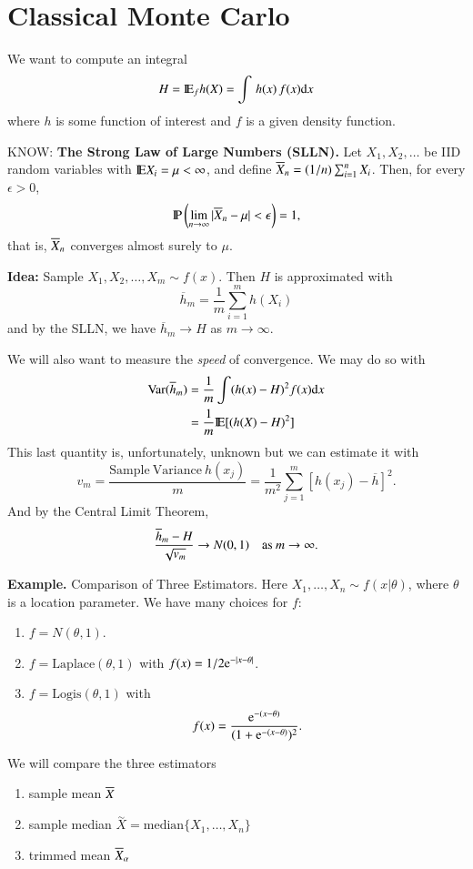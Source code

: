 \documentclass[11pt,english]{scrbook}
\begin{document}
\section{Classical Monte Carlo}
\label{sec:orge146c20}

We want to compute an integral 
\[
H=\mathrm{I\hspace{-1.5pt}E}_{f}h(X)=\int\, h(x)\, f(x)\mathrm{d} x
\]
where \(h\) is some function of interest and \(f\) is a given density function.

KNOW: \textbf{The Strong Law of Large Numbers (SLLN).} Let \(X_{1},X_{2},\ldots\) be IID random variables with \(\mathrm{I\hspace{-1.5pt}E} X_{i} = \mu < \infty\), and define \(\overline{X}_{n}=(1/n)\sum_{i=1}^{n}X_{i}\). Then, for every \(\epsilon>0\), 
\[
\mathrm{I\hspace{-1.5pt}P} \left(\lim_{n\to\infty} |\overline{X}_{n}-\mu| < \epsilon \right)=1,
\]
that is, \(\overline{X}_{n}\) converges almost surely to \(\mu\).

\textbf{Idea:} Sample \(X_{1},X_{2},\ldots,X_{m}\sim f(x)\). Then \(H\) is approximated with 
\[
\overline{h}_{m}=\frac{1}{m}\sum_{i=1}^{m}h(X_{i})
\]
and by the SLLN, we have \(\overline{h}_{m}\to H\) as \(m\to\infty\).

We will also want to measure the \emph{speed} of convergence. We may do so with 
\begin{align*}
\mathrm{Var}(\overline{h}_{m}) & =\frac{1}{m}\int(h(x)-H)^{2}f(x)\mathrm{d} x\\
 & =\frac{1}{m}\mathrm{I\hspace{-1.5pt}E}[(h(X)-H)^{2}]
\end{align*}
This last quantity is, unfortunately, unknown but we can estimate it with 
\[
v_{m}=\frac{\mathrm{Sample\ Variance}\ h(x_{j})}{m}=\frac{1}{m^{2}}\sum_{j=1}^{m}[h(x_{j})-\overline{h}]^{2}.
\]
And by the Central Limit Theorem, 
\[
\frac{\overline{h}_{m}-H}{\sqrt{v_{m}}}\to N(0,1)\quad\mbox{as \ensuremath{m\to\infty}}.
\]


\textbf{Example.} Comparison of Three Estimators. Here \(X_{1},\ldots,X_{n}\sim f(x|\theta)\), where \(\theta\) is a location parameter. We have many choices for \(f\):
\begin{enumerate}
\item \(f = N(\theta,1)\).
\item \(f = \mathrm{Laplace}(\theta,1)\) with \(f(x)=1/2 \mathrm{e}^{-|x-\theta|}\).
\item \(f = \mathrm{Logis}(\theta,1)\) with 
\[
   f(x)=\frac{\mathrm{e}^{-(x-\theta)}}{(1 + \mathrm{e}^{-(x - \theta)})^{2}}.
   \]
\end{enumerate}

We will compare the three estimators
\begin{enumerate}
\item sample mean \(\overline{X}\)
\item sample median \(\overset{\sim}{X}=\mbox{median}\{X_{1},\ldots,X_{n}\}\)
\item trimmed mean \(\overline{X}_{\alpha}\)
\end{enumerate}
\end{document}
